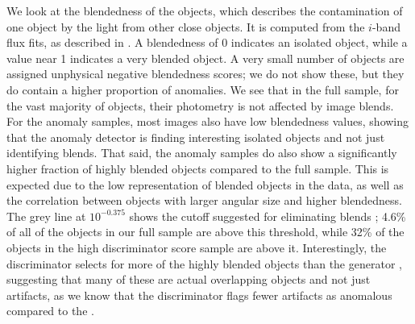 We look at the blendedness of the objects, which describes the contamination of one object by the light from other close objects. 
It is computed from the $i$-band flux fits, as described in \citep{Bosch2019}.
A blendedness of 0 indicates an isolated object, while a value near 1 indicates a very blended object. 
A very small number of objects are assigned unphysical negative blendedness scores; we do not show these, but they do contain a higher proportion of anomalies.
We see that in the full sample, for the vast majority of objects, their photometry is not affected by image blends.
For the anomaly samples, most images also have low blendedness values, showing that the anomaly detector is finding interesting isolated objects and not just identifying blends.
That said, the anomaly samples do also show a significantly higher fraction of highly blended objects compared to the full sample.
This is expected due to the low representation of blended objects in the data, as well as the correlation between objects with larger angular size and higher blendedness.
The grey line at $10^{-0.375}$ shows the cutoff suggested for eliminating blends \citep{Mandelbaum2018}; 4.6\% of all of the objects in our full sample are above this threshold, while 32\% of the objects in the high discriminator score sample are above it.
Interestingly, the discriminator selects for more of the highly blended objects than the generator , suggesting that many of these are actual overlapping objects and not just artifacts, as we know that the discriminator flags fewer artifacts as anomalous compared to the .


